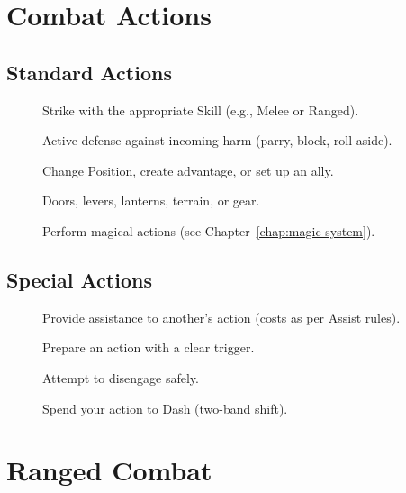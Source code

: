 \section{Combat Actions}
\label{sec:combat-actions}

\subsection{Standard Actions}
\label{subsec:standard-actions}
\begin{description}
  \item[] Strike with the appropriate Skill (e.g., Melee or Ranged). 
  \item[] Active defense against incoming harm (parry, block, roll aside). 
  \item[] Change Position, create advantage, or set up an ally. 
  \item[] Doors, levers, lanterns, terrain, or gear. 
  \item[] Perform magical actions (see Chapter~\ref{chap:magic-system}). 
\end{description}

\subsection{Special Actions}
\label{subsec:special-actions}
\begin{description}
  \item[] Provide assistance to another’s action (costs as per Assist rules). 
  \item[] Prepare an action with a clear trigger. 
  \item[] Attempt to disengage safely. 
  \item[] Spend your action to Dash (two-band shift). 
\end{description}

\section{Ranged Combat}
\label{sec:ranged}

